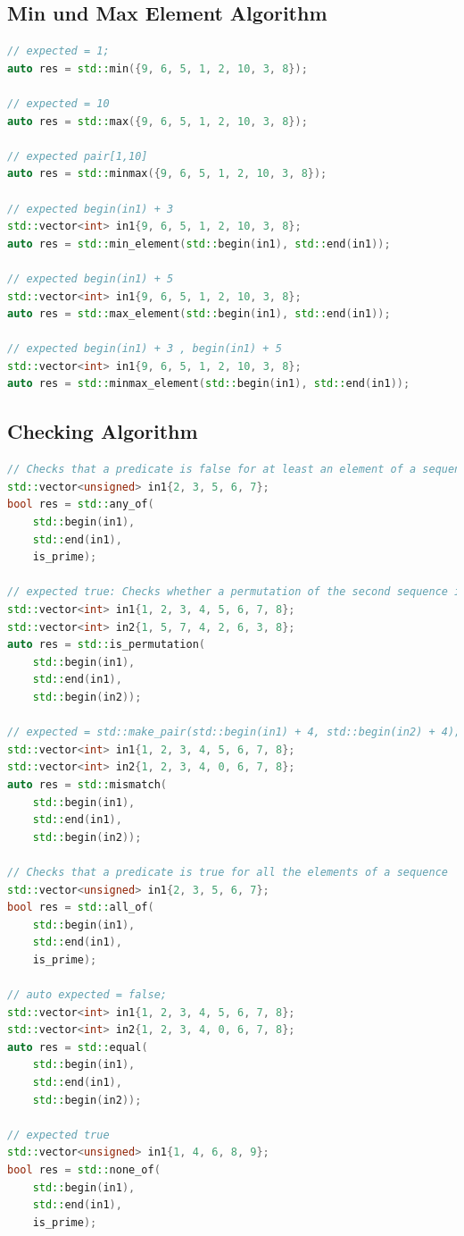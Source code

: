 \subsection{Min und Max Element Algorithm}
\begin{lstlisting}[language=C++, caption=Max Element Algorithm]
// expected = 1;
auto res = std::min({9, 6, 5, 1, 2, 10, 3, 8});

// expected = 10
auto res = std::max({9, 6, 5, 1, 2, 10, 3, 8});

// expected pair[1,10]
auto res = std::minmax({9, 6, 5, 1, 2, 10, 3, 8});

// expected begin(in1) + 3
std::vector<int> in1{9, 6, 5, 1, 2, 10, 3, 8};
auto res = std::min_element(std::begin(in1), std::end(in1));

// expected begin(in1) + 5 
std::vector<int> in1{9, 6, 5, 1, 2, 10, 3, 8};
auto res = std::max_element(std::begin(in1), std::end(in1));

// expected begin(in1) + 3 , begin(in1) + 5
std::vector<int> in1{9, 6, 5, 1, 2, 10, 3, 8};
auto res = std::minmax_element(std::begin(in1), std::end(in1));
\end{lstlisting}

\subsection{Checking Algorithm}
\begin{lstlisting}[language=C++, caption=Property Checking Algorithm]
// Checks that a predicate is false for at least an element of a sequence
std::vector<unsigned> in1{2, 3, 5, 6, 7};
bool res = std::any_of(
	std::begin(in1),
	std::end(in1),
	is_prime);

// expected true: Checks whether a permutation of the second sequence is equal to the first sequence
std::vector<int> in1{1, 2, 3, 4, 5, 6, 7, 8};
std::vector<int> in2{1, 5, 7, 4, 2, 6, 3, 8};
auto res = std::is_permutation(
	std::begin(in1),
	std::end(in1),
	std::begin(in2));

// expected = std::make_pair(std::begin(in1) + 4, std::begin(in2) + 4);	
std::vector<int> in1{1, 2, 3, 4, 5, 6, 7, 8};
std::vector<int> in2{1, 2, 3, 4, 0, 6, 7, 8};
auto res = std::mismatch(
	std::begin(in1),
	std::end(in1),
	std::begin(in2));
	
// Checks that a predicate is true for all the elements of a sequence
std::vector<unsigned> in1{2, 3, 5, 6, 7};
bool res = std::all_of(
	std::begin(in1),
	std::end(in1),
	is_prime);
	
// auto expected = false;
std::vector<int> in1{1, 2, 3, 4, 5, 6, 7, 8};
std::vector<int> in2{1, 2, 3, 4, 0, 6, 7, 8};
auto res = std::equal(
	std::begin(in1),
	std::end(in1),
	std::begin(in2));
	
// expected true
std::vector<unsigned> in1{1, 4, 6, 8, 9};
bool res = std::none_of(
	std::begin(in1),
	std::end(in1),
	is_prime);
\end{lstlisting}

